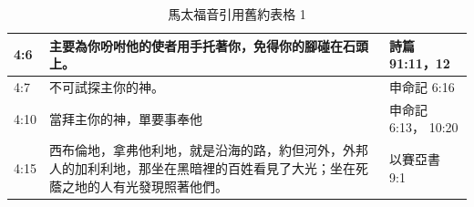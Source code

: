 \begin{table}[htbp]
\begin{tabular}{|p{4.2em}|p{31.645em}|p{7.3em}|}
    \midrule
    4:6   & 主要為你吩咐他的使者用手托著你，免得你的腳碰在石頭上。 & 詩篇 91:11，12 \\
    \midrule
    4:7   & 不可試探主你的神。 & 申命記 6:16 \\
    \midrule
    4:10  & 當拜主你的神，單要事奉他 & 申命記 6:13， 10:20 \\
    \midrule
    4:15  & 西布倫地，拿弗他利地，就是沿海的路，約但河外，外邦人的加利利地，那坐在黑暗裡的百姓看見了大光；坐在死蔭之地的人有光發現照著他們。 & 以賽亞書 9:1 \\
    \bottomrule
    \end{tabular}%
  \label{tab:addlabel}%
    \caption{馬太福音引用舊約表格 1}
\end{table}%





